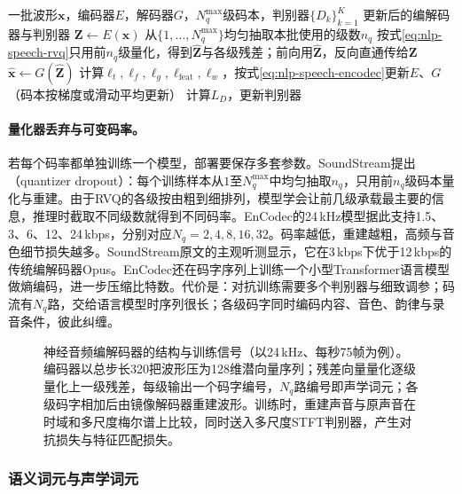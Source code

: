 \begin{algorithm}
  \label{alg:nlp-speech-codec}
  \begin{algorithmic}[1]
    \Require 一批波形$\bm x$，编码器$E$，解码器$G$，$N_q^{\max}$级码本，判别器$\{D_k\}_{k=1}^{K}$
    \Ensure 更新后的编解码器与判别器
    \State $\bm Z\gets E(\bm x)$ 
    \State 从$\{1,\ldots,N_q^{\max}\}$均匀抽取本批使用的级数$n_q$ 
    \State 按式\eqref{eq:nlp-speech-rvq}只用前$n_q$级量化，得到$\hat{\bm Z}$与各级残差；前向用$\hat{\bm Z}$，反向直通传给$\bm Z$
    \State $\hat{\bm x}\gets G(\hat{\bm Z})$
    \State 计算$\ell_t,\ell_f,\ell_g,\ell_{\mathrm{feat}},\ell_w$，按式\eqref{eq:nlp-speech-encodec}更新$E$、$G$（码本按梯度或滑动平均更新）
    \State 计算$L_D$，更新判别器 
  \end{algorithmic}
\end{algorithm}

\paragraph{量化器丢弃与可变码率。}若每个码率都单独训练一个模型，部署要保存多套参数。SoundStream提出（quantizer dropout）：每个训练样本从$1$至$N_q^{\max}$中均匀抽取$n_q$，只用前$n_q$级码本量化与重建。由于RVQ的各级按由粗到细排列，模型学会让前几级承载最主要的信息，推理时截取不同级数就得到不同码率。EnCodec的24\,kHz模型据此支持1.5、3、6、12、24\,kbps，分别对应$N_q=2,4,8,16,32$。码率越低，重建越粗，高频与音色细节损失越多。SoundStream原文的主观听测显示，它在3\,kbps下优于12\,kbps的传统编解码器Opus。EnCodec还在码字序列上训练一个小型Transformer语言模型做熵编码，进一步压缩比特数。代价是：对抗训练需要多个判别器与细致调参；码流有$N_q$路，交给语言模型时序列很长；各级码字同时编码内容、音色、韵律与录音条件，彼此纠缠。

\begin{figure}[htbp]
  \centering
  
  \caption{神经音频编解码器的结构与训练信号（以24\,kHz、每秒75帧为例）。编码器以总步长320把波形压为128维潜向量序列；残差向量量化逐级量化上一级残差，每级输出一个码字编号，$N_q$路编号即声学词元；各级码字相加后由镜像解码器重建波形。训练时，重建声音与原声音在时域和多尺度梅尔谱上比较，同时送入多尺度STFT判别器，产生对抗损失与特征匹配损失。}
  \label{fig:nlp-speech-codec}
\end{figure}

\subsubsection{语义词元与声学词元}
\label{sec:nlp-speech-semantic-acoustic}


